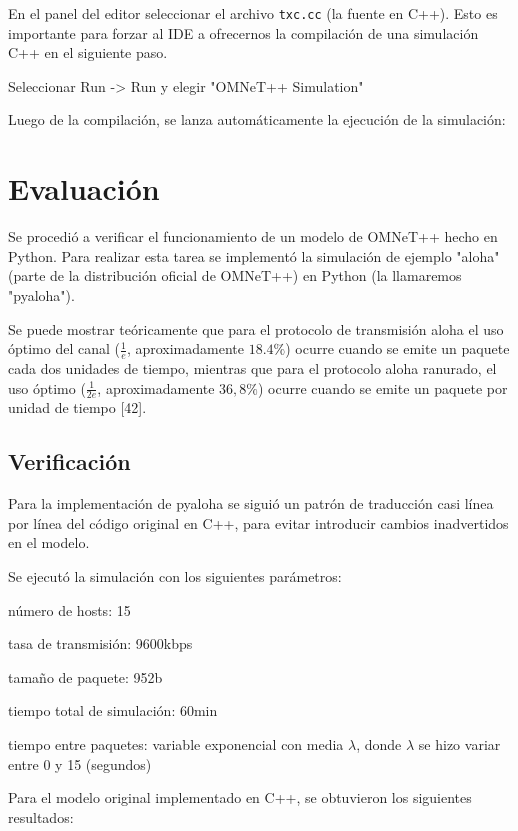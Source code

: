 \documentclass[]{article}
\begin{document}
En el panel del editor seleccionar el archivo \verb!txc.cc! (la fuente en C++).
Esto es importante para forzar al IDE a ofrecernos la compilación de una
simulación C++ en el siguiente paso.

Seleccionar Run -> Run y elegir "OMNeT++ Simulation"


Luego de la compilación, se lanza automáticamente la ejecución de la
simulación:


\section{Evaluación}

Se procedió a verificar el funcionamiento de un modelo de OMNeT++ hecho en
Python. Para realizar esta tarea se implementó la simulación de ejemplo "aloha"
(parte de la distribución oficial de OMNeT++) en Python (la llamaremos
"pyaloha").

Se puede mostrar teóricamente que para el protocolo de transmisión aloha el uso óptimo del
canal ($\frac{1}{e}$, aproximadamente $18.4\%$) ocurre cuando se emite un paquete cada dos
unidades de tiempo, mientras que para el protocolo aloha ranurado, el uso
óptimo ($\frac{1}{2e}$, aproximadamente $36,8\%$) ocurre cuando se emite un paquete por
unidad de tiempo [42].

\subsection{Verificación}

Para la implementación de pyaloha se siguió un patrón de traducción casi línea
por línea del código original en C++, para evitar introducir cambios
inadvertidos en el modelo.

Se ejecutó la simulación con los siguientes parámetros:

número de hosts: 15

tasa de transmisión: 9600kbps

tamaño de paquete: 952b

tiempo total de simulación: 60min

tiempo entre paquetes: variable exponencial con media $\lambda$, donde $\lambda$ se
hizo variar entre 0 y 15 (segundos)

Para el modelo original implementado en C++, se obtuvieron los siguientes
resultados:

\end{document}
